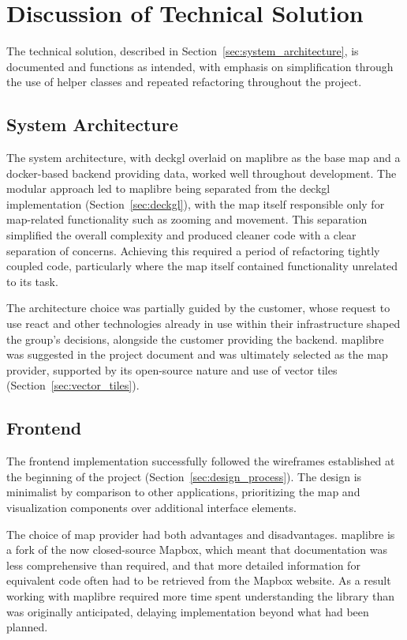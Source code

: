 \section{Discussion of Technical Solution}

The technical solution, described in Section~\ref{sec:system_architecture}, is documented and functions as intended, with emphasis on simplification through the use of helper classes and repeated refactoring throughout the project.


\subsection{System Architecture}

The system architecture, with \gls{deckgl} overlaid on \gls{maplibre} as the base map and a \gls{docker}-based backend providing data, worked well throughout development. The modular approach led to \gls{maplibre} being separated from the \gls{deckgl} implementation (Section~\ref{sec:deckgl}), with the map itself responsible only for  map-related functionality such as zooming and movement. This separation simplified the overall complexity and produced cleaner code with a clear separation of concerns. Achieving this required a period of refactoring tightly coupled code, particularly where the map itself contained functionality unrelated to its task. 

The architecture choice was partially guided by the customer, whose request to use \gls{react} and other technologies already in use within their infrastructure shaped the group's decisions, alongside the customer providing the backend. \gls{maplibre} was suggested in the project document and was ultimately selected as the map provider, supported by its open-source nature and use of vector tiles (Section~\ref{sec:vector_tiles}).

\subsection{Frontend}

The frontend implementation successfully followed the wireframes established at the beginning of the project (Section~\ref{sec:design_process}). The design is minimalist by comparison to other applications, prioritizing the map and visualization components over additional interface elements. 

The choice of map provider had both advantages and disadvantages. \gls{maplibre} is a fork of the now closed-source Mapbox, which meant that documentation was less comprehensive than required, and that more detailed information for equivalent code often had to be retrieved from the Mapbox website. As a result working with \gls{maplibre} required more time spent understanding the library than was originally anticipated, delaying implementation beyond what had been planned.

